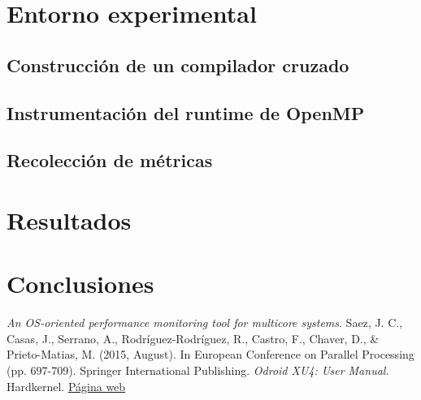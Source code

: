\section{Entorno experimental}

\subsection{Construcción de un compilador cruzado}

\subsection{Instrumentación del runtime de OpenMP}

\subsection{Recolección de métricas}

\section{Resultados}

\section{Conclusiones}\label{sec:conclu}


\begin{thebibliography}{1}
\textit{An OS-oriented performance monitoring tool for multicore systems}. Saez, J. C., Casas, J., Serrano, A., Rodríguez-Rodríguez, R., Castro, F., Chaver, D., \& Prieto-Matias, M. (2015, August). In European Conference on Parallel Processing (pp. 697-709). Springer International Publishing.
 \textit{Odroid XU4: User Manual}. Hardkernel. \href{http://magazine.odroid.com/odroid-xu4/}{Página web}

\end{thebibliography}

